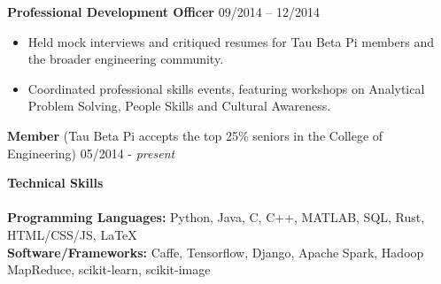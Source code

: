 \documentclass{article}
\begin{document}
\noindent
\textbf{Professional Development Officer}
\hfill 09/2014 -- 12/2014
\begin{itemize}
\vspace{-2.5mm}
\item Held mock interviews and critiqued resumes for Tau Beta Pi members and the broader engineering community.
\vspace{-6.5mm}
\item Coordinated professional skills events, featuring workshops on Analytical Problem Solving, People Skills and Cultural Awareness.
\end{itemize}
\vspace{-2mm}

\noindent
\textbf{Member} (Tau Beta Pi accepts the top 25\% seniors in the College of Engineering)
\hfill 05/2014 - \textit{present}
\vspace{3mm}


\noindent
\textbf{\Large Technical Skills}\\[-2mm]
\HRule\\
\textbf{Programming Languages:} Python, Java, C, C++, MATLAB, SQL, Rust, HTML/CSS/JS, \LaTeX \\
\textbf{Software/Frameworks:} Caffe, Tensorflow, Django, Apache Spark, Hadoop MapReduce, scikit-learn, scikit-image

\end{document}
